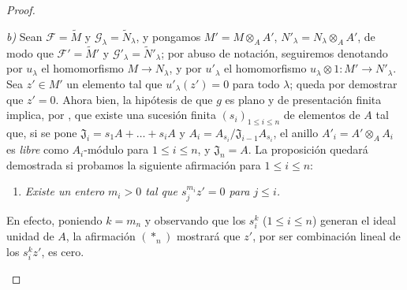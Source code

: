 \begin{proof}
\begin{enumerate}[label=(\roman*)]
  \emph{b)} Sean $\mathcal F=\widetilde M$ y $\mathcal G_\lambda=\widetilde N_\lambda$, y pongamos $M'=M\otimes_A A'$, $N'_\lambda=N_\lambda\otimes_A A'$, de modo que $\mathcal F'=\widetilde{M}'$ y $\mathcal G'_\lambda=\widetilde{N}'_\lambda$; por abuso de notación, seguiremos denotando por $u_\lambda$ el homomorfismo $M\to N_\lambda$, y por $u'_\lambda$ el homomorfismo $u_\lambda\otimes 1:M'\to N'_\lambda$.
  Sea $z'\in M'$ un elemento tal que $u'_\lambda(z')=0$ para todo $\lambda$; queda por demostrar que $z'=0$.
  Ahora bien, la hipótesis de que $g$ es plano y de presentación finita implica, por , que existe una sucesión finita $(s_i)_{1\leq i\leq n}$ de elementos de $A$ tal que, si se pone $\mathfrak J_i=s_1A+\ldots+s_iA$ y $A_i=A_{s_i}/\mathfrak J_{i-1}A_{s_i}$, el anillo $A'_i=A'\otimes_A A_i$ es \emph{libre} como $A_i$-módulo para $1\leq i\leq n$, y $\mathfrak J_n=A$.
  La proposición quedará demostrada si probamos la siguiente afirmación para $1\leq i\leq n$:
  \begin{enumerate}[label=$(*_i)$]
    \item \emph{Existe un entero $m_i>0$ tal que $s_j^{m_i}z'=0$ para $j\leq i$.}
  \end{enumerate}
  En efecto, poniendo $k=m_n$ y observando que los $s_i^k$ ($1\leq i\leq n$) generan el ideal unidad de $A$, la afirmación $(*_n)$ mostrará que $z'$, por ser combinación lineal de los $s_i^kz'$, es cero.


\end{enumerate}
\end{proof}

